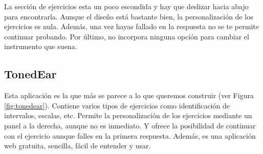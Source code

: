 \documentclass[12pt,twoside,titlepage]{report}
\begin{document}

La sección de ejercicios esta un poco escondida y hay que deslizar hacia abajo para encontrarla. Aunque el diseño está bastante bien, la personalización de los ejercicios es nula. Además, una vez hayas fallado en la respuesta no se te permite continuar probando. Por último, no incorpora ninguna opción para cambiar el instrumento que suena.
\cite{tonegym3}

\subsection{TonedEar}
\label{sec:TonedEar}

Esta aplicación es la que más se parece a lo que queremos construir (ver Figura \ref{fig:tonedear}). Contiene varios tipos de ejercicios como identificación de intervalos, escalas, etc. Permite la personalización de los ejercicios mediante un panel a la derecha, aunque no es inmediato. Y ofrece la posibilidad de continuar con el ejercicio aunque falles en la primera respuesta. Además, es una aplicación web gratuita, sencilla, fácil de entender y usar.
\cite{tonedear1}
\end{document}
